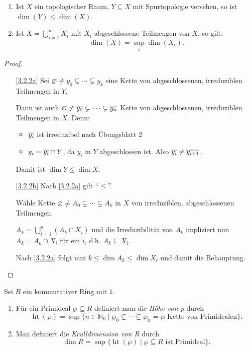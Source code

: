 \documentclass[a4paper,12pt]{scrbook}
\theoremstyle{keinenummern} %
\theoremstyle{mitnummern}
\theoremstyle{unserbeweis}
\newtheorem{proof}{Beweis}
\newcommand{\hoehe}{\operatorname{ht}}
\newcommand{\leer}{\ensuremath{\varnothing}}
\newcommand{\set}[1]{\ensuremath{\mathbb{#1}}}
\newcommand{\N}{\set{N}}
\def\Bar#1{\ensuremath\overline{#1}}
\begin{document}
\begin{bem}\label{3.2.2}
\begin{enumerate}
  \item{} Ist $X$ ein topologischer Raum, $Y\subseteq X$ mit Spurtopologie versehen, so ist $\dim(Y) \le \dim(X)$.
  \item{} Ist $X=\bigcup\limits_{i=1}^{n} X_i$ mit $X_i$ abgeschlossene Teilmengen von $X$, so gilt: 
  \[\dim(X)=\sup_{i} \dim(X_i).\]
\end{enumerate}
\end{bem}

\begin{proof}
  \begin{enumerate}
  \item[\ref{3.2.2a}] Sei $\leer \neq y_0 \varsubsetneq \dotsm \varsubsetneq y_k$ eine Kette von abgeschlossenen, irreduziblen Teilmengen in $Y$.

Dann ist auch $\leer \neq \Bar{y_0} \varsubsetneq \dotsm \varsubsetneq \Bar{y_n}$ Kette von abgeschlossenen, irreduziblen Teilmengen in $X$. Denn:
  \begin{itemize}
     \item $\Bar{y_i}$ ist irreduzibel nach Übungsblatt 2
     \item $y_i=\Bar{y_i} \cap Y$, da $y_i$ in $Y$ abgeschlossen ist. Also $\Bar{y_i}\neq \Bar{y_{i+1}}$.
   \end{itemize}
Damit ist $\dim Y\le \dim X$.  
  \item[\ref{3.2.2b}] Nach \ref{3.2.2a} gilt \enquote{$\le$}.

Wähle Kette $\leer \neq A_0 \varsubsetneq \dotsm \varsubsetneq A_k$ in $X$ von irreduziblen, abgeschlossenen Teilmengen.

$A_k=\bigcup\limits_{i=1}^{n} (A_k \cap X_i)$ und die Irreduzibilität von $A_k$ impliziert nun $A_k=A_k \cap X_i$ für ein $i$, d.h. $A_k\subseteq X_i$.

Nach \ref{3.2.2a} folgt nun $k \le \dim A_k \le \dim X_i$ und damit die Behauptung.
 \end{enumerate}
\end{proof}

\begin{erinnerung}\label{3.2.3}
Sei $R$ ein kommutativer Ring mit $1$.
  \begin{enumerate}
  \item{} Für ein Primideal $\wp \subseteq R$ definiert man die \emph{Höhe von p} durch
  \[ \hoehe(\wp)=\sup \{n\in \N_0 \mid \wp_0 \varsubsetneq \dotsm \varsubsetneq \wp_n=\wp \text{ Kette von Primidealen}\}.\]
  \item{} Man definiert die \emph{Krulldimension von R} durch
  \[\dim R=\sup\{\hoehe(\wp) \mid \wp \subseteq R \text { ist Primideal}\}.\] 
  \end{enumerate}
\end{erinnerung}
\end{document}

